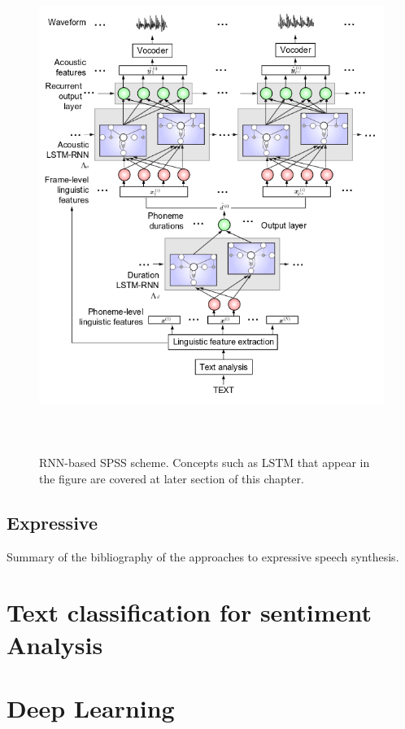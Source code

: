 \begin{figure}
\centering
    \includegraphics[height=16cm]{figures/rnn-tts}
    \caption{RNN-based SPSS scheme. Concepts such as LSTM that appear in the figure are covered at later section of this chapter.}
    \label{fig:rnn-tts-0}
\end{figure}

\subsection{Expressive}

Summary of the bibliography of the approaches to expressive speech synthesis.

\section{Text classification for sentiment Analysis}


\section{Deep Learning}

